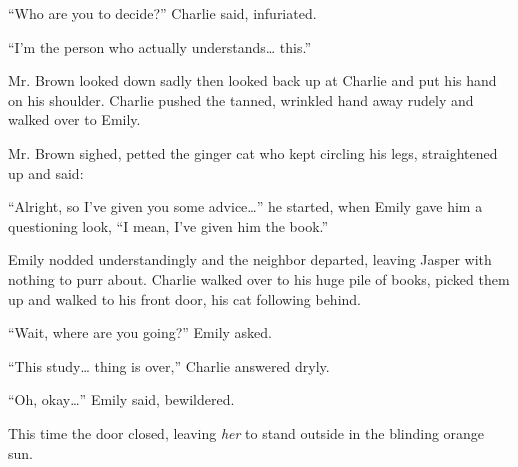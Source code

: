 “Who are you to decide?” Charlie said, infuriated.

“I'm the person who actually understands… this.”

Mr. Brown looked down sadly then looked back up at Charlie and put his hand on his shoulder. Charlie pushed the tanned, wrinkled hand away rudely and walked over to Emily.

Mr. Brown sighed, petted the ginger cat who kept circling his legs, straightened up and said:

“Alright, so I've given you some advice…” he started, when Emily gave him a questioning look, “I mean, I've given him the book.”

Emily nodded understandingly and the neighbor departed, leaving Jasper with nothing to purr about. Charlie walked over to his huge pile of books, picked them up and walked to his front door, his cat following behind.

“Wait, where are you going?” Emily asked.

“This study… thing is over,” Charlie answered dryly.

“Oh, okay…” Emily said, bewildered.

This time the door closed, leaving \textit{her} to stand outside in the blinding orange sun.